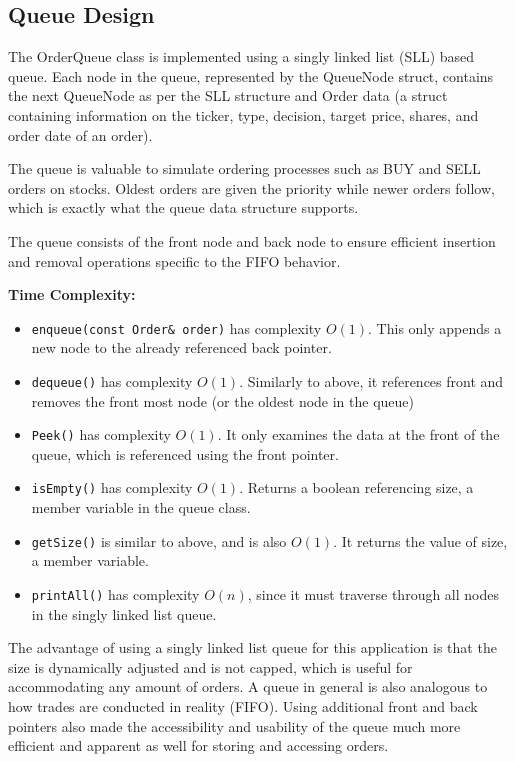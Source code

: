 \documentclass[12pt]{article}
\begin{document}
\subsection{Queue Design}
The OrderQueue class is implemented using a singly linked list (SLL) based queue. Each node in the queue, represented by the QueueNode struct, contains the next QueueNode as per the SLL structure and Order data (a struct containing information on the ticker, type, decision, target price, shares, and order date of an order). 

The queue is valuable to simulate ordering processes such as BUY and SELL orders on stocks. Oldest orders are given the priority while newer orders follow, which is exactly what the queue data structure supports. 

The queue consists of the front node and back node to ensure efficient insertion and removal operations specific to the FIFO behavior. 

\vspace{0.5cm}
{\large{\textbf{Time Complexity:}}}
\begin{itemize}
    \item \texttt{enqueue(const Order\& order)} has complexity $O(1)$. This only appends a new node to the already referenced back pointer. 
    \item \texttt{dequeue()} has complexity $O(1)$. Similarly to above, it references front and removes the front most node (or the oldest node in the queue)
    \item \texttt{Peek()} has complexity $O(1)$. It only examines the data at the front of the queue, which is referenced using the front pointer. 
    \item \texttt{isEmpty()} has complexity $O(1)$. Returns a boolean referencing size, a member variable in the queue class. 
    \item \texttt{getSize()} is similar to above, and is also $O(1)$. It returns the value of size, a member variable. 
    \item \texttt{printAll()} has complexity $O(n)$, since it must traverse through all nodes in the singly linked list queue. 
\end{itemize}

The advantage of using a singly linked list queue for this application is that the size is dynamically adjusted 
and is not capped, which is useful for accommodating any amount of orders. 
A queue in general is also analogous to how trades are conducted in reality (FIFO). 
Using additional front and back pointers also made the accessibility and usability of the queue much more 
efficient and apparent as well for storing and accessing orders. 
\end{document}
